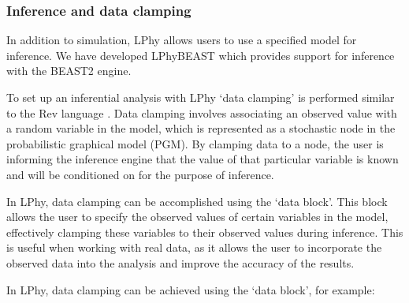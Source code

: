 \documentclass[10pt,letterpaper,table]{article}
\theoremstyle{definition}
\begin{document}
\subsubsection{Inference and data clamping}
\label{sec:dataclamping}
In addition to simulation, LPhy allows users to use a specified model for inference. 
We have developed LPhyBEAST which provides support for inference with the BEAST2 engine. 

To set up an inferential analysis with LPhy `data clamping' is performed similar to the Rev language \cite{revbayes}.
Data clamping involves associating an observed value with a random variable in the model, which is represented as a stochastic node in the probabilistic graphical model (PGM). 
By clamping data to a node, the user is informing the inference engine that the value of that particular variable is known and will be conditioned on for the purpose of inference.

In LPhy, data clamping can be accomplished using the `data block'. 
This block allows the user to specify the observed values of certain variables in the model, effectively clamping these variables to their observed values during inference. 
This is useful when working with real data, as it allows the user to incorporate the observed data into the analysis and improve the accuracy of the results.

In LPhy, data clamping can be achieved using the `data block', for example:
\end{document}
